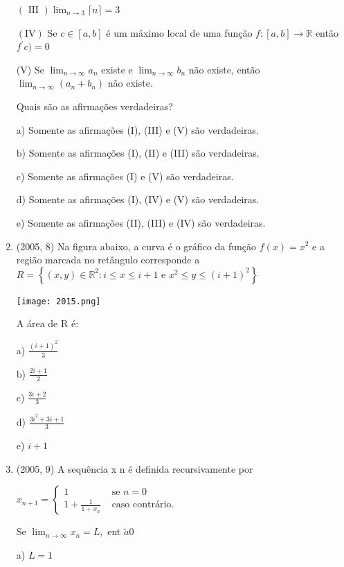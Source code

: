 \documentclass{article}
\begin{document}
\begin{enumerate}
$(\text { III }) \lim _{n \rightarrow 3}\lceil n\rceil= 3$

$(\mathrm{IV})$ Se $c \in[a, b]$ é um máximo local de uma função $f :[a, b] \rightarrow \mathbb{R}$ então $f^{\prime}c)=0$

(V) Se $\lim _{n \rightarrow \infty} a_{n}$ existe e $\lim _{n \rightarrow \infty} b_{n}$ não existe, então $\lim _{n \rightarrow \infty}\left(a_{n}+b_{n}\right)$ não existe.


Quais são as afirmações verdadeiras?


a) Somente as afirmações (I), (III) e (V) são verdadeiras.

b) Somente as afirmações (I), (II) e (III) são verdadeiras.

c) Somente as afirmações (I) e (V) são verdadeiras.

d) Somente as afirmações (I), (IV) e (V) são verdadeiras.

e) Somente as afirmações (II), (III) e (IV) são verdadeiras.\newline


\item(2005, 8) Na figura abaixo, a curva é o gráfico da função $f ( x ) = x ^ { 2 }$ e a região marcada no retângulo corresponde a $R=\left\{(x, y) \in \mathbb{R}^{2} : i \leq x \leq i+1 \text { e } x^{2} \leq y \leq(i+1)^{2}\right\}$ 

\texttt{[image: 2015.png]}\newline


A área de R é:

a) $\frac{(i+1)^{2}}{3}$

b) $\frac{2 i+1}{2}$

c) $\frac{3 i+2}{3}$

d) $\frac{3 i^{2}+3 i+1}{3}$

e) $i+1$\newline






\item(2005, 9) A sequência x n é definida recursivamente por

$x_{n+1}=\left\{\begin{array}{ll}{1} & {\text { se } n=0} \\ {1+\frac{1}{1+x_{n}}} & {\text { caso contrário. }}\end{array}\right.$

Se $\lim _{n \rightarrow \infty} x_{n}=L,$ ent $\tilde{a} 0$

a) $L=1$


\end{enumerate}
\end{document}
